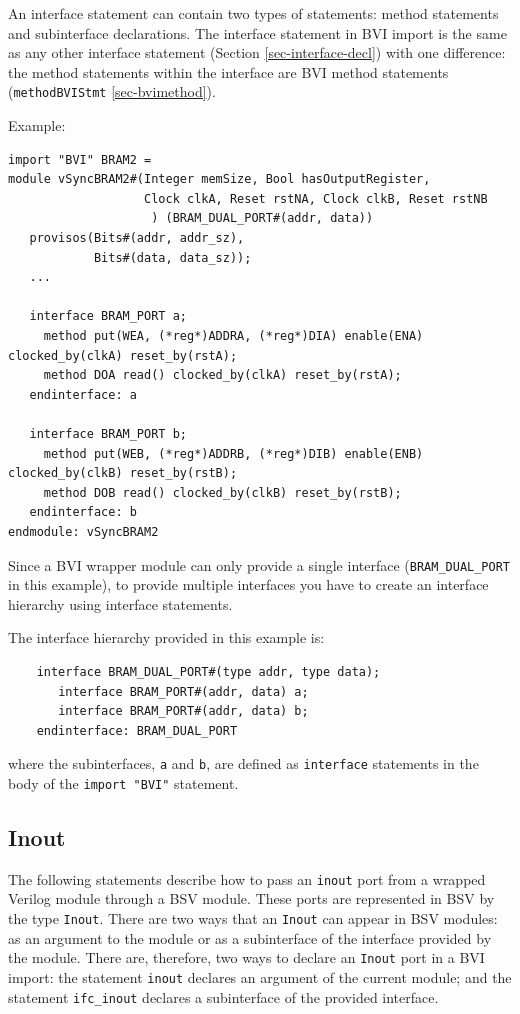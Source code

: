 \documentclass[twoside,letterpaper]{article}
\newcommand{\BSV}{BSV}
\newcommand{\te}[1]{\texttt{#1}}
\begin{document}
 An interface statement can contain   two types of
statements: method statements and subinterface declarations.
The interface statement in BVI import
is the same as any other interface statement (Section
\ref{sec-interface-decl}) with one difference: the method statements
within the interface  are BVI method statements
(\te{methodBVIStmt} \ref{sec-bvimethod}).  

Example:

\begin{verbatim}
import "BVI" BRAM2 =
module vSyncBRAM2#(Integer memSize, Bool hasOutputRegister,
                   Clock clkA, Reset rstNA, Clock clkB, Reset rstNB
                    ) (BRAM_DUAL_PORT#(addr, data))
   provisos(Bits#(addr, addr_sz),
            Bits#(data, data_sz));
   ...

   interface BRAM_PORT a;
     method put(WEA, (*reg*)ADDRA, (*reg*)DIA) enable(ENA) clocked_by(clkA) reset_by(rstA);
     method DOA read() clocked_by(clkA) reset_by(rstA);
   endinterface: a

   interface BRAM_PORT b;
     method put(WEB, (*reg*)ADDRB, (*reg*)DIB) enable(ENB) clocked_by(clkB) reset_by(rstB);
     method DOB read() clocked_by(clkB) reset_by(rstB);
   endinterface: b
endmodule: vSyncBRAM2
\end{verbatim}

Since a BVI wrapper module can
only provide a single interface (\te{BRAM\_DUAL\_PORT} in this
example), to provide  multiple interfaces you have to create an
interface hierarchy using interface statements.

The  interface hierarchy provided in this example is:
\begin{verbatim}
    interface BRAM_DUAL_PORT#(type addr, type data);
       interface BRAM_PORT#(addr, data) a;
       interface BRAM_PORT#(addr, data) b;
    endinterface: BRAM_DUAL_PORT
\end{verbatim}
where the subinterfaces, \te{a} and \te{b}, are defined as
\te{interface} statements in the body of the \te{import "BVI"} statement.


\subsection{Inout}
\index{inout@\te{inout}(BVI import statement)}

The following statements describe how to pass an \te{inout} port
from a wrapped Verilog module through a BSV module.  These ports
are represented in \BSV{} by the type \te{Inout}.  There are two ways
that an \te{Inout} can appear in \BSV{} modules: as an argument to the
module or as a subinterface of the interface provided by the module.
There are, therefore, two ways to declare an \te{Inout} port in a BVI import:
the statement \te{inout} declares an argument of the current module;
and the statement \te{ifc\_inout} declares a subinterface of the
provided interface.
\end{document}
